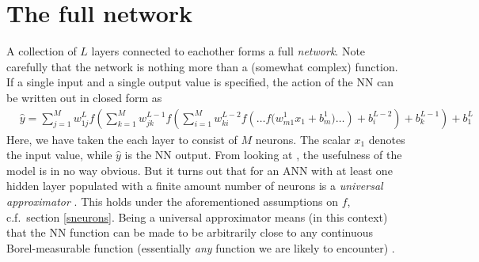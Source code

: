 \documentclass[../../master.tex]{subfiles}
\begin{document}
\begin{SCfigure}
\begin{centering}
\end{centering}
\caption{Schematic representation of a single ANN layer. Each neuron of the layer indexed $k$ is connected from behind to all neurons in layer $k-1$. The connection weights can be organized into a matrix, $W^{k-1}$, and the action of layer $k$ can be succinctly stated as $f(W^{k}{\bf p}^{k-1}+{\bf b}^k)$ where element-wise operation is assumed for the activation $f$. \label{fig:layer}}
\end{SCfigure}

\section{The full network}
A collection of $L$ layers connected to eachother forms a full \emph{network}. Note carefully that the network is nothing more than a (somewhat complex) function. If a single input and a single output value is specified, the action of the NN can be written out in closed form as \cite{stende}
\begin{align}
&\hat y\! = \!\left.\!\sum_{j=1}^{M}\! w_{1j}^L f\!\left(\!\sum_{k=1}^{M}\! w_{jk}^{L-1} f\!\left(\!
\sum_{i=1}^Mw_{ki}^{L-2} f\left( \dots \!f\!\Big(\!w_{m1}^1 x_1 \! + \!b_m^1\!\Big)
 \!\dots \!\right)+ b_i^{L-2}\right) \!+ \!b_k^{L-1}\!\right)
 \!+ \!b_1^L\!\right. && \label{eq:nnfull}
\end{align}
Here, we have taken the each layer to consist of $M$ neurons. The scalar $x_1$ denotes the input value, while $\hat y$ is the NN output. From looking at , the usefulness of the model is in no way obvious. But it turns out that for an ANN with at least one hidden layer populated with a finite amount number of neurons is a \emph{universal approximator} \cite{HORNIK1989359}. This holds under the aforementioned assumptions on $f$, c.f.\ section \ref{sneurons}. Being a universal approximator means (in this context) that the NN function can be made to be arbitrarily close to any continuous Borel-measurable function (essentially \emph{any} function we are likely to encounter) \cite{mcdonald}. 
\end{document}

